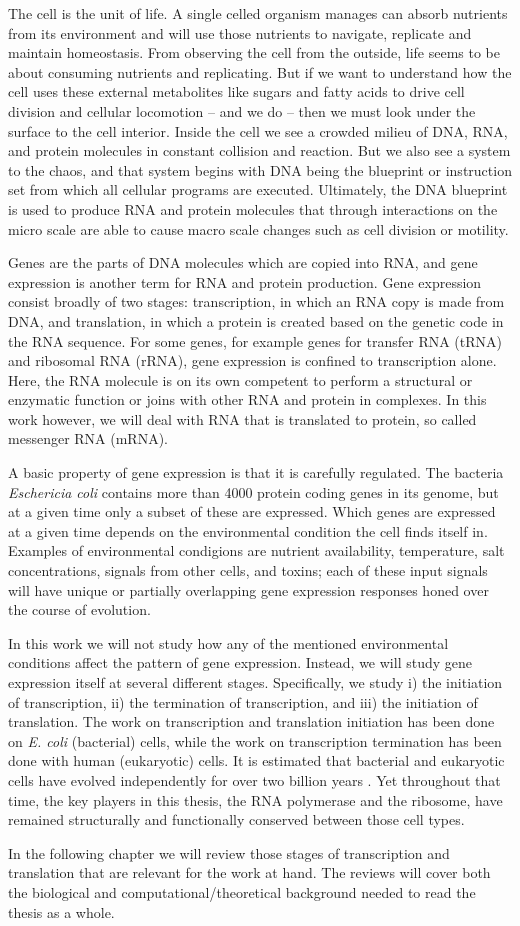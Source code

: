 %

The cell is the unit of life. A single celled organism manages can absorb
nutrients from its environment and will use those nutrients to navigate,
replicate and maintain homeostasis. From observing the cell from the outside,
life seems to be about consuming nutrients and replicating. But if we want to
understand how the cell uses these external metabolites like sugars and fatty
acids to drive cell division and cellular locomotion -- and we do -- then we
must look under the surface to the cell interior. Inside the cell we see a
crowded milieu of DNA, RNA, and protein molecules in constant collision and
reaction. But we also see a system to the chaos, and that system begins with
DNA being the blueprint or instruction set from which all cellular programs are
executed.  Ultimately, the DNA blueprint is used to produce RNA and protein
molecules that through interactions on the micro scale are able to cause macro
scale changes such as cell division or motility.

Genes are the parts of DNA molecules which are copied into RNA, and gene
expression is another term for RNA and protein production. Gene expression
consist broadly of two stages: transcription, in which an RNA copy is made from
DNA, and translation, in which a protein is created based on the genetic code
in the RNA sequence. For some genes, for example genes for transfer RNA (tRNA)
and ribosomal RNA (rRNA), gene expression is confined to transcription alone.
Here, the RNA molecule is on its own competent to perform a structural or
enzymatic function or joins with other RNA and protein in complexes. In this
work however, we will deal with RNA that is translated to protein, so called
messenger RNA (mRNA).

A basic property of gene expression is that it is carefully regulated. The
bacteria \textit{Eschericia coli} contains more than 4000 protein coding genes
in its genome, but at a given time only a subset of these are expressed. Which
genes are expressed at a given time depends on the environmental condition the
cell finds itself in. Examples of environmental condigions are nutrient
availability, temperature, salt concentrations, signals from other cells, and
toxins; each of these input signals will have unique or partially overlapping
gene expression responses honed over the course of evolution.

In this work we will not study how any of the mentioned environmental
conditions affect the pattern of gene expression. Instead, we will study gene
expression itself at several different stages. Specifically, we study i) the
initiation of transcription, ii) the termination of transcription, and iii) the
initiation of translation. The work on transcription and translation initiation
has been done on \textit{E. coli} (bacterial) cells, while the work on
transcription termination has been done with human (eukaryotic) cells. It is
estimated that bacterial and eukaryotic cells have evolved independently for
over two billion years \cite{vellai_origin_1999}. Yet throughout that time, the
key players in this thesis, the RNA polymerase and the ribosome, have remained
structurally and functionally conserved between those cell types.

In the following chapter we will review those stages of transcription and
translation that are relevant for the work at hand. The reviews will cover both
the biological and computational/theoretical background needed to read the
thesis as a whole.
